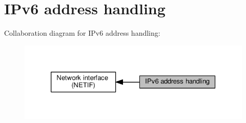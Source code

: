 \hypertarget{group__netif__ip6}{}\section{I\+Pv6 address handling}
\label{group__netif__ip6}
Collaboration diagram for I\+Pv6 address handling\+:
\nopagebreak
\begin{figure}[H]
\begin{center}
\leavevmode
\includegraphics[width=326pt]{group__netif__ip6}
\end{center}
\end{figure}
